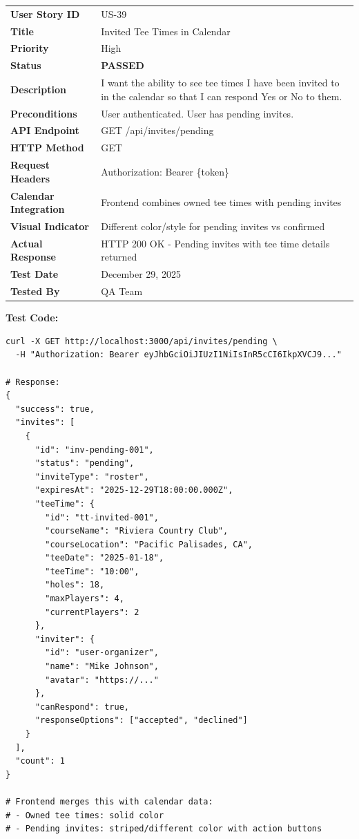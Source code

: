 \documentclass[11pt,a4paper]{article}
\newcommand{\passed}{\textcolor{pass}{\textbf{PASSED}}}
\begin{document}
\begin{tabularx}{\textwidth}{|p{3.2cm}|Y|}
\hline
{}
 \\
\hline
\textbf{User Story ID} & US-39 \\
\hline
\textbf{Title} & Invited Tee Times in Calendar \\
\hline
\textbf{Priority} & High \\
\hline
\textbf{Status} & \passed \\
\hline
\textbf{Description} & I want the ability to see tee times I have been invited to in the calendar so that I can respond Yes or No to them. \\
\hline
\textbf{Preconditions} & User authenticated. User has pending invites. \\
\hline
\textbf{API Endpoint} & GET /api/invites/pending \\
\hline
\textbf{HTTP Method} & GET \\
\hline
\textbf{Request Headers} & Authorization: Bearer \{token\} \\
\hline
\textbf{Calendar Integration} & Frontend combines owned tee times with pending invites \\
\hline
\textbf{Visual Indicator} & Different color/style for pending invites vs confirmed \\
\hline
\textbf{Actual Response} & HTTP 200 OK - Pending invites with tee time details returned \\
\hline
\textbf{Test Date} & December 29, 2025 \\
\hline
\textbf{Tested By} & QA Team \\
\hline
\end{tabularx}

\vspace{0.3cm}
\textbf{Test Code:}
\begin{lstlisting}
curl -X GET http://localhost:3000/api/invites/pending \
  -H "Authorization: Bearer eyJhbGciOiJIUzI1NiIsInR5cCI6IkpXVCJ9..."

# Response:
{
  "success": true,
  "invites": [
    {
      "id": "inv-pending-001",
      "status": "pending",
      "inviteType": "roster",
      "expiresAt": "2025-12-29T18:00:00.000Z",
      "teeTime": {
        "id": "tt-invited-001",
        "courseName": "Riviera Country Club",
        "courseLocation": "Pacific Palisades, CA",
        "teeDate": "2025-01-18",
        "teeTime": "10:00",
        "holes": 18,
        "maxPlayers": 4,
        "currentPlayers": 2
      },
      "inviter": {
        "id": "user-organizer",
        "name": "Mike Johnson",
        "avatar": "https://..."
      },
      "canRespond": true,
      "responseOptions": ["accepted", "declined"]
    }
  ],
  "count": 1
}

# Frontend merges this with calendar data:
# - Owned tee times: solid color
# - Pending invites: striped/different color with action buttons
\end{lstlisting}
\end{document}
